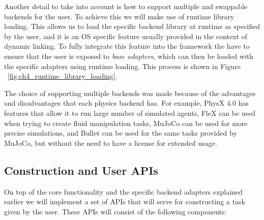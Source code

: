 \figBridgePattern


Another detail to take into account is how to support multiple and swappable backends
for the user. To achieve this we will make use of runtime library loading. This allows us
to load the specific backend library at runtime as specified by the user, and it is an OS specific
feature usually provided in the context of dynamic linking. To fully integrate
this feature into the framework the have to ensure that the user is exposed
to \textit{base adapters}, which can then be loaded with the specific adapters using runtime loading.
This process is shown in Figure ~\ref{fig:ch4_runtime_library_loading}.

\figRuntimeLibraryLoading



The choice of supporting multiple backends was made because of the advantages and
disadvantages that each physics backend has. For example, PhysX 4.0 has features that
allow it to run large number of simulated agents, FleX can be used when trying to
create fluid manipulation tasks, MuJoCo can be used for more precise simulations, and
Bullet can be used for the same tasks provided by MuJoCo, but without the need to have
a license for extended usage.

\subsection{Construction and User APIs}

On top of the core functionality and the specific backend adapters explained earlier
we will implement a set of APIs that will serve for constructing a task given by the user.
These APIs will consist of the following components:


